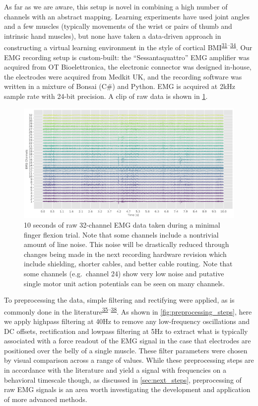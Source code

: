 \documentclass[
  a4paper,
]{article}
\begin{document}
As far as we are aware, this setup is novel in combining a high number
of channels with an abstract mapping. Learning experiments have used
joint angles and a few muscles (typically movements of the wrist or
pairs of thumb and intrinsic hand muscles), but none have taken a
data-driven approach in constructing a virtual learning environment in
the style of cortical
BMI\textsuperscript{\protect\hyperlink{ref-BergerDifferencesInAdaptationRates2013a}{31}--\protect\hyperlink{ref-Gallego2017}{34}}.
Our EMG recording setup is custom-built: the ``Sessantaquattro'' EMG
amplifier was acquired from OT Bioelettronica, the electronic connector
was designed in-house, the electrodes were acquired from Medkit UK, and
the recording software was written in a mixture of Bonsai (C\#) and
Python. EMG is acquired at 2kHz sample rate with 24-bit precision. A
clip of raw data is shown in \cref{fig:raw_data}.

\begin{figure}
\hypertarget{fig:raw_data}{%
\centering
\includegraphics[width=1\textwidth,height=\textheight]{images/data_analysis/fingers/raw_data.pdf}
\caption{10 seconds of raw 32-channel EMG data taken during a minimal
finger flexion trial. Note that some channels include a nontrivial
amount of line noise. This noise will be drastically reduced through
changes being made in the next recording hardware revision which include
shielding, shorter cables, and better cable routing. Note that some
channels (e.g.~channel 24) show very low noise and putative single motor
unit action potentials can be seen on many
channels.}\label{fig:raw_data}
}
\end{figure}

To preprocessing the data, simple filtering and rectifying were applied,
as is commonly done in the
literature\textsuperscript{\protect\hyperlink{ref-sangerBayesianFilteringMyoelectric2007}{35}--\protect\hyperlink{ref-sussillo2015}{38}}.
As shown in \cref{fig:preprocessing_steps}, here we apply highpass
filtering at 40Hz to remove any low-frequency oscillations and DC
offsets, rectification and lowpass filtering at 5Hz to extract what is
typically associated with a force readout of the EMG signal in the case
that electrodes are positioned over the belly of a single muscle. These
filter parameters were chosen by visual comparison across a range of
values. While these preprocessing steps are in accordance with the
literature and yield a signal with frequencies on a behavioral timescale
though, as discussed in \cref{sec:next_steps}, preprocessing of raw EMG
signals is an area worth investigating the development and application
of more advanced methods.
\end{document}

